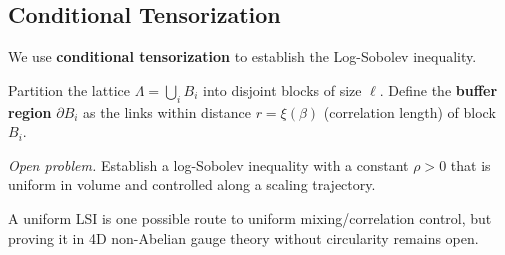 \subsection{Conditional Tensorization}
\label{sec:conditional-tensorization}

We use \textbf{conditional tensorization} to establish the Log-Sobolev inequality.

\begin{definition}
\label{def:block-buffer}
Partition the lattice $\Lambda = \bigcup_i B_i$ into disjoint blocks of size $\ell$.
Define the \textbf{buffer region} $\partial B_i$ as the links within distance 
$r = \xi(\beta)$ (correlation length) of block $B_i$.
\end{definition}

\begin{theorem}
\label{thm:conditional-tensorization-app143}
\label{thm:block-zeg-sec12}
\label{thm:conditional-tensorization-sec12}
\label{thm:block-zeg}
\emph{Open problem.} Establish a log-Sobolev inequality with a constant $\rho>0$ that is uniform in volume and controlled along a scaling trajectory.
\end{theorem}

\begin{remark}
A uniform LSI is one possible route to uniform mixing/correlation control, but proving it in 4D non-Abelian gauge theory without circularity remains open.
\end{remark}


